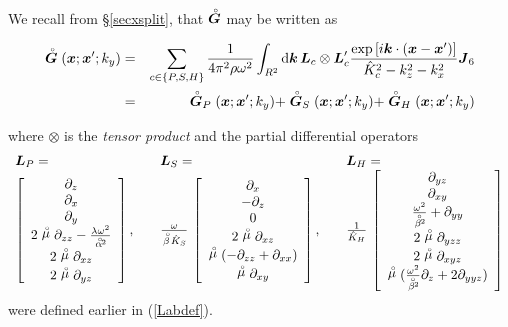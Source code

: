We recall from \S\ref{secxsplit}, that
$\rf{\bmi G}$ may be written as 
\begin{samepage} 
\begin{eqnarray}\label{c4grepc}
\rf{\bmi  G}({\bmi  x};{{\bmi  x}}^{\prime};k_y)& =&\sum\limits_{c\in \{P,S,H\}}
\frac{1}{4{ \pi }^{2}\rho \omega^2}
\int_{{R}^{2}} {\rm d}{\bmi k}\, {\bmi L}_{c} \otimes {\bmi  L}_{c}^{\prime}
\frac{
\exp \left[{i {\bmi k}  \cdot  ({\bmi x}-{\bmi x}^{\prime})}\right]  
}{ \hat{K}^{2}_{ c } - {k}^{2}_{z} - {k}^{2}_{x}} {\bmi J}_{6}\nonumber\\
&=&
\rf{\bmi  G}_{P}({\bmi  x};{{\bmi  x}}^{\prime};k_y)+
\rf{\bmi  G}_{S}({\bmi  x};{{\bmi  x}}^{\prime};k_y)+
\rf{\bmi  G}_{H}({\bmi  x};{{\bmi  x}}^{\prime};k_y)
\end{eqnarray} 
\end{samepage}
where  $\otimes$ is the {\em tensor product\/} and 
 the partial differential 
operators
\begin{eqnarray} \label{c4Labdef}
\begin{array}{lll}
{\bmi L}_{P}=&{\bmi L}_{S}=&{\bmi L}_{H}=\\
\left[\begin{array}{c}
\partial_{z} \\
\partial_{x} \\ 
\partial_{y} \\ 
2 \rf{\mu} \partial_{zz} - {\lambda \omega^{2}\over \rf{\alpha}\!{}^2}\\
    2 \rf{\mu} \partial_{xz} \\ 
   2 \rf{\mu} \partial_{yz}
\end{array}\right], \quad& 
\frac{\omega }{\rf{\beta} \hat{K}_{S}}\,
\left[\begin{array}{c}
\partial_{x} \\-\partial_{z} \\ 0 \\
2 \rf{\mu} \partial_{xz}\\  
   \rf{\mu} (-\partial_{zz} + \partial_{xx}) \\ 
   \rf{\mu} \partial_{xy} 
\end{array}\right], \quad&
\frac{1 }{\hat{K}_{H}}\,
\left[\begin{array}{c}
   \partial_{yz} \\
\partial_{xy} \\ 
{\omega^{2}\over \rf{\beta}\!{}^2} + \partial_{yy} \\ 
 2 \rf{\mu} \partial_{yzz}\\
    2 \rf{\mu} \partial_{xyz} \\ 
   \rf{\mu} ({\omega^{2}\over \rf{\beta}\!{}^2}\partial_{z} + 2 \partial_{yyz}) 
\end{array}\right]
\end{array}
\end{eqnarray}
were defined earlier in (\ref{Labdef}).

